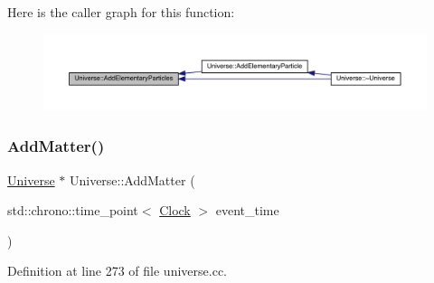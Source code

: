 Here is the caller graph for this function\+:
\nopagebreak
\begin{figure}[H]
\begin{center}
\leavevmode
\includegraphics[width=350pt]{class_universe_a857cf7f208cd11c80736e82fa523feb5_icgraph}
\end{center}
\end{figure}
\mbox{\label{class_universe_a090d9ad1b88d81364e872e17d65edca4}} 
\subsubsection{\texorpdfstring{Add\+Matter()}{AddMatter()}}
{\footnotesize\ttfamily \hyperlink{class_universe}{Universe} $\ast$ Universe\+::\+Add\+Matter (\begin{DoxyParamCaption}\item[{std\+::chrono\+::time\+\_\+point$<$ \hyperlink{universe_8h_a0ef8d951d1ca5ab3cfaf7ab4c7a6fd80}{Clock} $>$}]{event\+\_\+time }\end{DoxyParamCaption})}



Definition at line 273 of file universe.\+cc.

